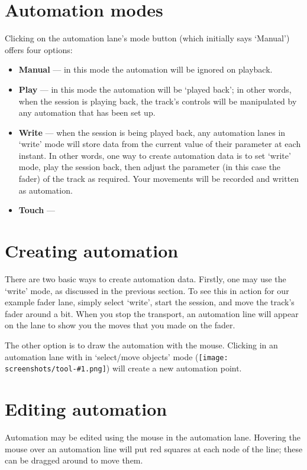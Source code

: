 \documentclass[10pt,a4paper]{book}
\newcommand{\todo}[1]{\marginpar{\small\texttt{#1}}}
\newcommand{\inlinetool}[1]{\texttt{[image: screenshots/tool-\#1.png]}}
\begin{document}
{\section{Automation modes}

Clicking on the automation lane's mode button (which initially says `Manual') offers four options:

\begin{itemize}
\item \textbf{Manual} --- in this mode the automation will be ignored on playback.
\item \textbf{Play} --- in this mode the automation will be `played
  back'; in other words, when the session is playing back, the track's
  controls will be manipulated by any automation that has been set up.
\item \textbf{Write} --- when the session is being played back, any
  automation lanes in `write' mode will store data from the current
  value of their parameter at each instant.  In other words, one way
  to create automation data is to set `write' mode, play the session
  back, then adjust the parameter (in this case the fader) of the
  track as required.  Your movements will be recorded and written as
  automation.
\item \textbf{Touch} --- \todo{doesn't seem to work right now}
\end{itemize}


\section{Creating automation}

There are two basic ways to create automation data.  Firstly, one may
use the `write' mode, as discussed in the previous section.  To see
this in action for our example fader lane, simply select `write',
start the session, and move the track's fader around a bit.  When you
stop the transport, an automation line will appear on the lane to show
you the moves that you made on the fader.

The other option is to draw the automation with the mouse.  Clicking
in an automation lane with in `select/move objects' mode
(\inlinetool{objects}) will create a new automation point.


\section{Editing automation}

Automation may be edited using the mouse in the automation lane.
Hovering the mouse over an automation line will put red squares at
each node of the line; these can be dragged around to move them.

}
\end{document}
